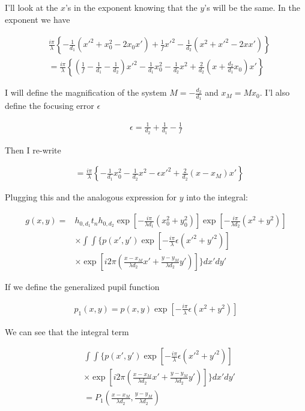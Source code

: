 \documentclass[12pt]{article}
\begin{document}
I'll look at the $x$'s in the exponent knowing that the $y$'s will be the same. In the exponent we have

\begin{align}
&\frac{i\pi}{\lambda}\left\{-\frac{1}{d_1}(x'^2+x_0^2-2x_0x') + \frac{1}{f} x'^2 - \frac{1}{d_2}(x^2 + x'^2 - 2xx')\right\}\\
&= \frac{i\pi}{\lambda}\left\{\left(\frac{1}{f}-\frac{1}{d_1}-\frac{1}{d_2}\right) x'^2 - \frac{1}{d_1} x_0^2 -\frac{1}{d_2}x^2 +\frac{2}{d_2} \left(x+\frac{d_2}{d_1}x_0\right)x' \right\}
\end{align}

I will define the magnification of the system $M = -\frac{d_2}{d_1}$ and $x_M = Mx_0$. I'l also define the focusing error $\epsilon$

\begin{align}
\epsilon = \frac{1}{d_2}+\frac{1}{d_1} - \frac{1}{f}
\end{align}

Then I re-write

\begin{align}
&= \frac{i\pi}{\lambda}\left\{-\frac{1}{d_1} x_0^2 -\frac{1}{d_2}x^2 - \epsilon x'^2 + \frac{2}{d_2} \left(x-x_M\right)x' \right\}
\end{align}

Plugging this and the analogous expression for $y$ into the integral:

\begin{align}
g(x,y) =& h_{0,d_1} t_n h_{0,d_2} \exp\left[-\frac{i\pi}{\lambda d_1}(x_0^2+y_0^2)\right]\exp\left[-\frac{i\pi}{\lambda d_2}(x^2+y^2)\right]\\
&\times \int\int \Bigg\{p(x',y') \exp\left[-\frac{i\pi}{\lambda}\epsilon (x'^2+y'^2)\right]\\
&\times \exp\left[i2\pi\left(\frac{x-x_M}{\lambda d_2}x' + \frac{y-y_M}{\lambda d_2}y'\right)\right] \Bigg\} dx'dy'
\end{align}

If we define the generalized pupil function

\begin{align}
p_1(x,y) = p(x,y) \exp\left[-\frac{i\pi}{\lambda}\epsilon(x^2+y^2)\right]
\end{align}

We can see that the integral term

\begin{align}
&\int\int \Bigg\{p(x',y') \exp\left[-\frac{i\pi}{\lambda}\epsilon (x'^2+y'^2)\right]\\
&\times \exp\left[i2\pi\left(\frac{x-x_M}{\lambda d_2}x' + \frac{y-y_M}{\lambda d_2}y'\right)\right] \Bigg\} dx'dy'\\
&= P_1\left(\frac{x-x_M}{\lambda d_2}, \frac{y-y_M}{\lambda d_2}\right)
\end{align}
\end{document}
